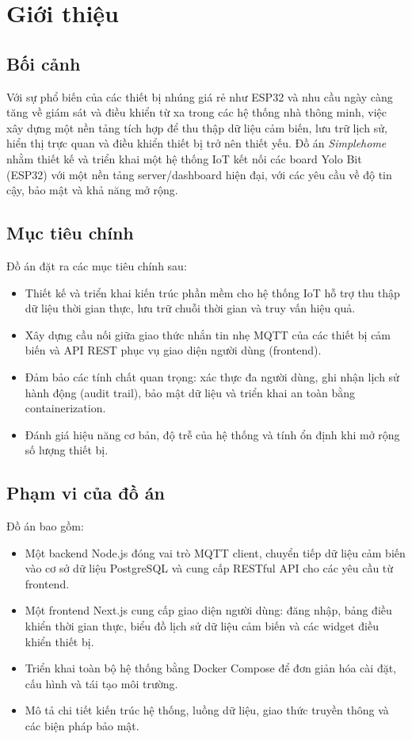 \section{Giới thiệu}

\subsection*{Bối cảnh}
Với sự phổ biến của các thiết bị nhúng giá rẻ như ESP32 và nhu cầu ngày càng tăng về giám sát và điều khiển từ xa trong các hệ thống nhà thông minh, việc xây dựng một nền tảng tích hợp để thu thập dữ liệu cảm biến, lưu trữ lịch sử, hiển thị trực quan và điều khiển thiết bị trở nên thiết yếu. Đồ án \textit{Simplehome} nhằm thiết kế và triển khai một hệ thống IoT kết nối các board Yolo Bit (ESP32) với một nền tảng server/dashboard hiện đại, với các yêu cầu về độ tin cậy, bảo mật và khả năng mở rộng.

\subsection*{Mục tiêu chính}
Đồ án đặt ra các mục tiêu chính sau:
\begin{itemize}
    \item Thiết kế và triển khai kiến trúc phần mềm cho hệ thống IoT hỗ trợ thu thập dữ liệu thời gian thực, lưu trữ chuỗi thời gian và truy vấn hiệu quả.
    \item Xây dựng cầu nối giữa giao thức nhắn tin nhẹ MQTT của các thiết bị cảm biến và API REST phục vụ giao diện người dùng (frontend).
    \item Đảm bảo các tính chất quan trọng: xác thực đa người dùng, ghi nhận lịch sử hành động (audit trail), bảo mật dữ liệu và triển khai an toàn bằng containerization.
    \item Đánh giá hiệu năng cơ bản, độ trễ của hệ thống và tính ổn định khi mở rộng số lượng thiết bị.
\end{itemize}

\subsection*{Phạm vi của đồ án}
Đồ án bao gồm:
\begin{itemize}
    \item Một backend Node.js đóng vai trò MQTT client, chuyển tiếp dữ liệu cảm biến vào cơ sở dữ liệu PostgreSQL và cung cấp RESTful API cho các yêu cầu từ frontend.
    \item Một frontend Next.js cung cấp giao diện người dùng: đăng nhập, bảng điều khiển thời gian thực, biểu đồ lịch sử dữ liệu cảm biến và các widget điều khiển thiết bị.
    \item Triển khai toàn bộ hệ thống bằng Docker Compose để đơn giản hóa cài đặt, cấu hình và tái tạo môi trường.
    \item Mô tả chi tiết kiến trúc hệ thống, luồng dữ liệu, giao thức truyền thông và các biện pháp bảo mật.
\end{itemize}

